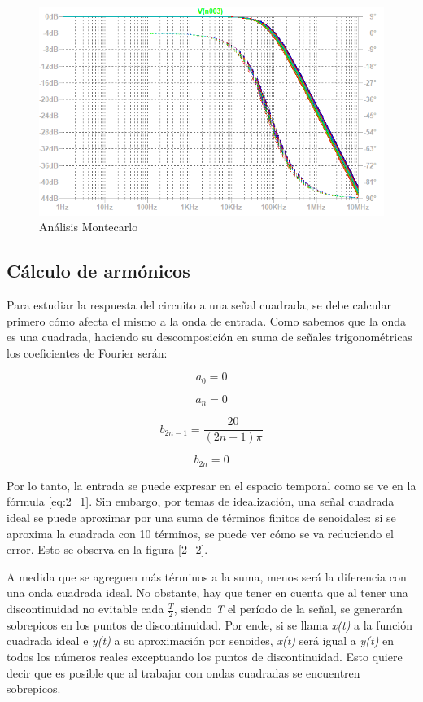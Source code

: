 \begin{figure}[H]
\begin{centering}
\includegraphics[scale=0.6]{../Ex2/resources2/montecarlo} 
\par\end{centering}
\caption{Análisis Montecarlo}
\label{2_5} 
\end{figure}

\subsection{Cálculo de armónicos}

Para estudiar la respuesta del circuito a una señal cuadrada, se debe
calcular primero cómo afecta el mismo a la onda de entrada.
Como sabemos que la onda es una cuadrada, haciendo su descomposición
en suma de señales trigonométricas los coeficientes de Fourier serán:

\[
a_{0}=0
\]

\[
a_{n}=0
\]

\[
b_{2n-1}=\frac{20}{(2n-1)\pi}
\]

\[
b_{2n}=0
\]

Por lo tanto, la entrada se puede expresar en el espacio temporal
como se ve en la fórmula \ref{eq:2_1}. Sin embargo,
por temas de idealización, una señal cuadrada ideal se puede
aproximar por una suma de términos finitos de senoidales:
si se aproxima la cuadrada con 10 términos, se puede ver cómo se va reduciendo el error. 
Esto se observa en la figura \ref{2_2}.

A medida que se agreguen más términos a la suma, menos será la
diferencia con una onda cuadrada ideal. No obstante, hay que tener
en cuenta que al tener una discontinuidad
no evitable cada $\frac{T}{2}$, siendo \emph{T} el período de la
señal, se generarán sobrepicos en los puntos de discontinuidad. Por
ende, si se llama \emph{x(t)} a la función cuadrada ideal e \emph{y(t)}
a su aproximación por senoides, \emph{x(t)} será igual a \emph{y(t)
}en todos los números reales exceptuando los puntos de discontinuidad.
Esto quiere decir que es posible que al trabajar con ondas cuadradas
se encuentren sobrepicos.

